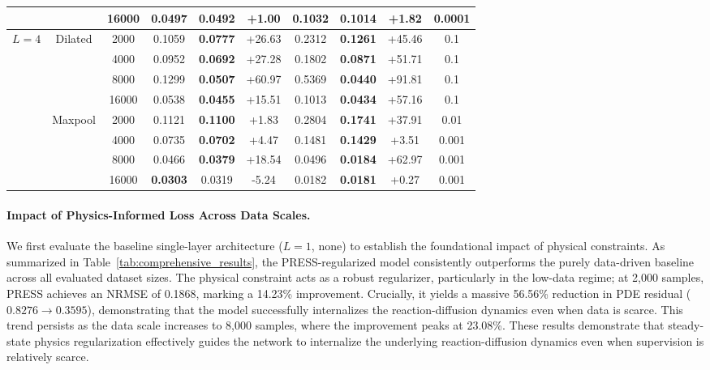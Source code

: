 \documentclass{article} %
\begin{document}
\begin{table}[ht]
\begin{tabular}{cccccccccc}
& & 16000 & 0.0497 & \textbf{0.0492} & +1.00  & 0.1032 & \textbf{0.1014} & +1.82  & 0.0001 \\
\midrule
\multirow{8}{*}{$L=4$} & \multirow{4}{*}{Dilated}
  & 2000  & 0.1059 & \textbf{0.0777} & +26.63 & 0.2312 & \textbf{0.1261} & +45.46 & 0.1 \\
& & 4000  & 0.0952 & \textbf{0.0692} & +27.28 & 0.1802 & \textbf{0.0871} & +51.71 & 0.1 \\
& & 8000  & 0.1299 & \textbf{0.0507} & +60.97 & 0.5369 & \textbf{0.0440} & +91.81 & 0.1 \\
& & 16000 & 0.0538 & \textbf{0.0455} & +15.51 & 0.1013 & \textbf{0.0434} & +57.16 & 0.1 \\
\cmidrule(lr){2-10}
& \multirow{4}{*}{Maxpool}
  & 2000  & 0.1121 & \textbf{0.1100} & +1.83  & 0.2804 & \textbf{0.1741} & +37.91 & 0.01 \\
& & 4000  & 0.0735 & \textbf{0.0702} & +4.47  & 0.1481 & \textbf{0.1429} & +3.51  & 0.001 \\
& & 8000  & 0.0466 & \textbf{0.0379} & +18.54 & 0.0496 & \textbf{0.0184} & +62.97 & 0.001 \\
& & 16000 & \textbf{0.0303} & 0.0319 & -5.24  & 0.0182 & \textbf{0.0181} & +0.27  & 0.001 \\
\bottomrule
\end{tabular}
\end{table}

\paragraph{Impact of Physics-Informed Loss Across Data Scales.}

We first evaluate the baseline single-layer architecture ($L=1$, none) to establish the foundational impact of physical constraints. As summarized in Table~\ref{tab:comprehensive_results}, the PRESS-regularized model consistently outperforms the purely data-driven baseline across all evaluated dataset sizes. The physical constraint acts as a robust regularizer, particularly in the low-data regime; at 2,000 samples,  PRESS achieves an NRMSE of 0.1868, marking a 14.23\% improvement. Crucially, it yields a massive 56.56\% reduction in PDE residual ($0.8276 \to 0.3595$), demonstrating that the model successfully internalizes the reaction-diffusion dynamics even when data is scarce. This trend persists as the data scale increases to 8,000 samples, where the improvement peaks at 23.08\%. These results demonstrate that steady-state physics regularization effectively guides the network to internalize the underlying reaction-diffusion dynamics even when supervision is relatively scarce.
\end{document}
